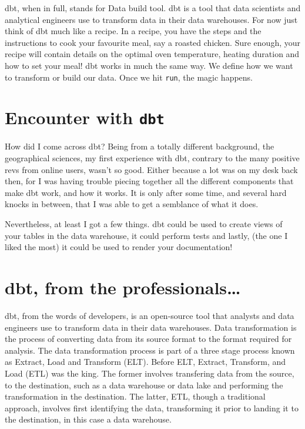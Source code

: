 \documentclass[
]{book}
\begin{document}
dbt, when in full, stands for Data build tool. dbt is a tool that data scientists and analytical engineers use to transform data in their data warehouses. For now just think of dbt much like a recipe. In a recipe, you have the steps and the instructions to cook your favourite meal, say a roasted chicken. Sure enough, your recipe will contain details on the optimal oven temperature, heating duration and how to set your meal! dbt works in much the same way. We define how we want to transform or build our data. Once we hit \texttt{run}, the magic happens.

\hypertarget{encounter-with-dbt}{%
\section{\texorpdfstring{Encounter with \texttt{dbt}}{Encounter with dbt}}\label{encounter-with-dbt}}

How did I come across dbt? Being from a totally different background, the geographical sciences, my first experience with dbt, contrary to the many positive revs from online users, wasn't so good. Either because a lot was on my desk back then, for I was having trouble piecing together all the different components that make dbt work, and how it works. It is only after some time, and several hard knocks in between, that I was able to get a semblance of what it does.

Nevertheless, at least I got a few things. dbt could be used to create views of your tables in the data warehouse, it could perform tests and lastly, (the one I liked the most) it could be used to render your documentation!

\hypertarget{dbt-from-the-professionals}{%
\section{dbt, from the professionals\ldots{}}\label{dbt-from-the-professionals}}

dbt, from the words of developers, is an open-source tool that analysts and data engineers use to transform data in their data warehouses. Data transformation is the process of converting data from its source format to the format required for analysis. The data transformation process is part of a three stage process known as Extract, Load and Transform (ELT). Before ELT, Extract, Transform, and Load (ETL) was the king. The former involves transfering data from the source, to the destination, such as a data warehouse or data lake and performing the transformation in the destination. The latter, ETL, though a traditional approach, involves first identifying the data, transforming it prior to landing it to the destination, in this case a data warehouse.
\end{document}
